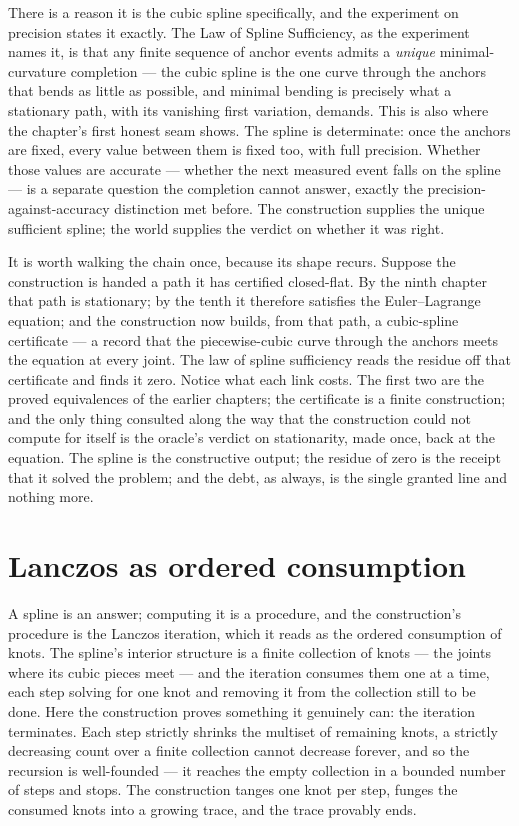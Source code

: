 There is a reason it is the cubic spline specifically, and the experiment on precision states it
exactly. The Law of Spline Sufficiency, as the experiment names it, is that any finite sequence of
anchor events admits a \emph{unique} minimal-curvature completion --- the cubic spline is the one curve
through the anchors that bends as little as possible, and minimal bending is precisely what a
stationary path, with its vanishing first variation, demands. This is also where the chapter's first
honest seam shows. The spline is determinate: once the anchors are fixed, every value between them is
fixed too, with full precision. Whether those values are accurate --- whether the next measured event
falls on the spline --- is a separate question the completion cannot answer, exactly the
precision-against-accuracy distinction met before. The construction supplies the unique sufficient
spline; the world supplies the verdict on whether it was right.

It is worth walking the chain once, because its shape recurs. Suppose the construction is handed a path
it has certified closed-flat. By the ninth chapter that path is stationary; by the tenth it therefore
satisfies the Euler--Lagrange equation; and the construction now builds, from that path, a cubic-spline
certificate --- a record that the piecewise-cubic curve through the anchors meets the equation at every
joint. The law of spline sufficiency reads the residue off that certificate and finds it zero. Notice
what each link costs. The first two are the proved equivalences of the earlier chapters; the
certificate is a finite construction; and the only thing consulted along the way that the construction
could not compute for itself is the oracle's verdict on stationarity, made once, back at the equation.
The spline is the constructive output; the residue of zero is the receipt that it solved the problem;
and the debt, as always, is the single granted line and nothing more.

\section{Lanczos as ordered consumption}
\label{se:lanczos-as-ordered-consumption}

A spline is an answer; computing it is a procedure, and the construction's procedure is the Lanczos
iteration, which it reads as the ordered consumption of knots. The spline's interior structure is a
finite collection of knots --- the joints where its cubic pieces meet --- and the iteration consumes
them one at a time, each step solving for one knot and removing it from the collection still to be
done. Here the construction proves something it genuinely can: the iteration terminates. Each step
strictly shrinks the multiset of remaining knots, a strictly decreasing count over a finite collection
cannot decrease forever, and so the recursion is well-founded --- it reaches the empty collection in a
bounded number of steps and stops. The construction tanges one knot per step, funges the consumed
knots into a growing trace, and the trace provably ends.

